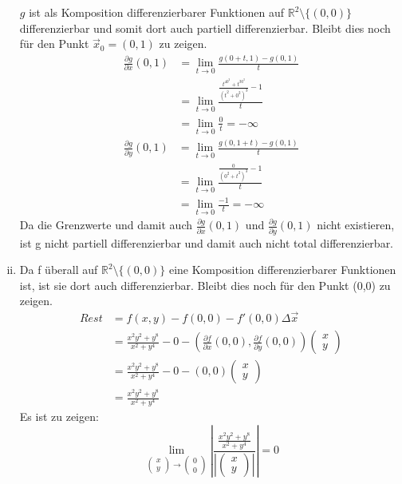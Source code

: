 \documentclass[10pt,a4paper,parskip=half]{scrartcl}
\newcommand{\R}{\mathbb{R}}
\begin{document}
\begin{enumerate}[(i)]
$g$ ist als Komposition differenzierbarer Funktionen auf $\R^2\setminus{\{(0,0)\}}$ differenzierbar und somit dort auch partiell differenzierbar. Bleibt dies noch für den Punkt $\vec x_0 = (0,1)$ zu zeigen.
\begin{align*}
\frac{\partial g}{\partial x} (0,1)&= \lim_{t \to 0} \frac{g(0+t,1)-g(0,1)}{t}\\
&= \lim_{t \to 0} \frac{\frac{t^40^2+t^30^3}{(t^2+0^2)^3} - 1}{t}\\
&= \lim_{t \to 0} \frac{0}{t} = -\infty
\end{align*}
\begin{align*}
\frac{\partial g}{\partial y} (0,1)&= \lim_{t \to 0} \frac{g(0,1+t)-g(0,1)}{t}\\
&= \lim_{t \to 0} \frac{\frac{0}{(0^2+t^2)^3} - 1}{t}\\
&= \lim_{t \to 0} \frac{-1}{t} = -\infty
\end{align*}
Da die Grenzwerte und damit auch $\frac {\partial g}{\partial x} (0,1)$ und $\frac {\partial g}{\partial y}(0,1)$ nicht existieren, ist g nicht partiell differenzierbar und damit auch nicht total differenzierbar. 
\newpage
\item
Da f überall auf $\mathbb R^2\setminus{\{(0,0)\}}$ eine Komposition differenzierbarer Funktionen ist, ist sie dort auch differenzierbar. Bleibt dies noch für den Punkt (0,0) zu zeigen.
\begin{align*}
{Rest} &= f(x,y) - f(0,0) - f'(0,0) \Delta \vec x\\
&= \frac{x^2y^2+y^8}{x^2 + y^4} - 0 - \left(\frac{\partial f}{\partial x}(0,0),\frac{\partial f}{\partial y}(0,0)\right) \begin{pmatrix}x\\y\end{pmatrix}\\
&= \frac{x^2y^2+y^8}{x^2 + y^4} - 0 -(0,0)\begin{pmatrix}x\\y\end{pmatrix}\\
&=\frac{x^2y^2+y^8}{x^2 + y^4}
\end{align*}
Es ist zu zeigen: $$\lim_{\begin{pmatrix}x\\y\end{pmatrix} \to \begin{pmatrix}0\\0\end{pmatrix}} \left|\frac{\frac{x^2y^2+y^8}{x^2 + y^4}}{\left|\begin{pmatrix}x\\y\end{pmatrix}\right|}\right| = 0$$


\end{enumerate}
\end{document}

